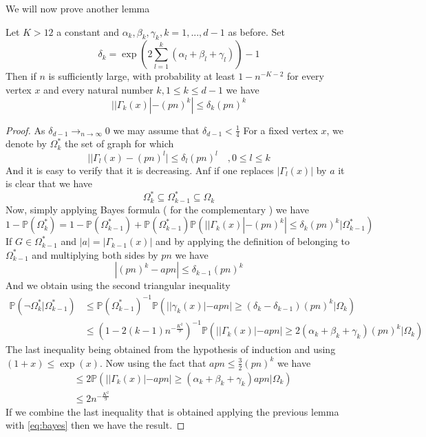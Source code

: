 We will now prove another lemma
\begin{lemma}
	Let $K > 12$ a constant and $\alpha_k, \beta_k, \gamma_k, k=1,...,d-1$ as before.
	\newline
	Set 
	\begin{equation}
		\delta_k = \exp(2\sum_{l=1}^{k}(\alpha_l + \beta_l +\gamma_l)) - 1
	\end{equation}
	Then if $n$ is sufficiently large, with probability at least $1-n^{-K-2}$ for every vertex $x$ and every natural number $k, 1\leq k \leq d-1$ we have
	\begin{equation}
		||\Gamma_k(x)| - (pn)^k| \leq \delta_k(pn)^k
	\end{equation}
\end{lemma}

\begin{proof}
	As $\delta_{d-1} \longrightarrow_{n\to\infty} 0$ we may assume that $\delta_{d-1} < \frac{1}{4}$
	For a fixed vertex $x$, we denote by $\Omega_k^*$ the set of graph for which 
	\begin{equation}
		||\Gamma_l(x) - (pn)^l| \leq \delta_l(pn)^l \quad , 0 \leq l \leq k
	\end{equation}
	And it is easy to verify that it is decreasing. Anf if one replaces $|\Gamma_l(x)|$ by $a$ it is clear that we have
	\begin{equation}
		\Omega_k^* \subseteq \Omega_{k-1}^* \subseteq \Omega_k
	\end{equation}
	Now, simply applying Bayes formula ( for the complementary ) we have
	\begin{equation}\label{eq:bayes}
		1 - \mathbb{P}(\Omega_k^*)= 1-\mathbb{P}(\Omega_{k-1}^*)
		+ \mathbb{P}(\Omega_{k-1}^*)\mathbb{P}(||\Gamma_k(x)| - (pn)^k| \leq \delta_k(pn)^k | \Omega_{k-1}^*)
	\end{equation}
	If $G \in \Omega_{k-1}^*$ and $|a| = |\Gamma_{k-1}(x)|$ and by applying the definition of belonging to $\Omega_{k-1}^*$ and multiplying both sides by $pn$ we have 
	\begin{equation}
		|(pn)^k - apn| \leq \delta_{k-1}(pn)^k
	\end{equation}
	And we obtain using the second triangular inequality
	\begin{align}
		\mathbb{P}(\neg\Omega_k^* | \Omega_{k-1}^*) 
		&\leq \mathbb{P}(\Omega_{k-1}^*)^{-1}\mathbb{P}(||\gamma_k(x)| - apn| \geq (\delta_k - \delta_{k-1})(pn)^k | \Omega_k)\\
		&\leq (1 - 2(k-1)n^{-\frac{K^2}{9}})^{-1}\mathbb{P}(||\Gamma_k(x)| - apn| \geq 2(\alpha_k + \beta_k + \gamma_k)(pn)^k | \Omega_k)
	\end{align}
	The last inequality being obtained from the hypothesis of induction and using $(1+x) \leq \exp(x)$. Now using the fact that $apn \leq \frac{3}{2} (pn)^k$ we have
	\begin{align}
		&\leq 2\mathbb{P}(||\Gamma_k(x)| - apn| \geq (\alpha_k + \beta_k + \gamma_k)apn | \Omega_k)\\
		&\leq 2n^{-\frac{K^2}{9}}
	\end{align}
	If we combine the last inequality that is obtained applying the previous lemma with \ref{eq:bayes} then we have the result.
\end{proof}
